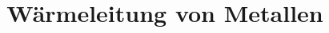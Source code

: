 

\subject{Versuch 204}
\title{Wärmeleitung von Metallen}


    \maketitle
    \thispagestyle{empty}
    \tableofcontents
    \newpage
    
    
    
    \newpage
    
    
    
    \printbibliography{}

